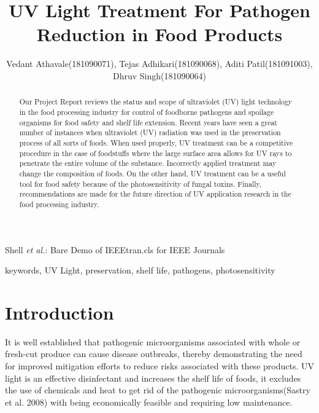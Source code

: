 \documentclass[journal]{IEEEtran}
\begin{document}
\title{\selectfont \centering UV Light Treatment For Pathogen Reduction in Food Products}

\author{\selectfont \centering 
		Vedant Athavale(181090071),
        Tejas Adhikari(181090068),
        Aditi Patil(181091003),
        Dhruv Singh(181090064)
        }
        
{Shell \MakeLowercase{\textit{et al.}}: Bare Demo of IEEEtran.cls for IEEE Journals}

\maketitle

\begin{abstract}
Our Project Report reviews the status and scope of ultraviolet (UV) light technology in the food processing industry for control of foodborne pathogens and spoilage organisms for food safety and shelf life extension. Recent years have seen a great number of instances when ultraviolet (UV) radiation was used in the preservation process of all sorts of foods. When used properly, UV treatment can be a competitive procedure in the case of foodstuffs where the large surface area allows for UV rays to penetrate the entire volume of the substance. Incorrectly applied treatment may change the composition of foods. On the other hand, UV treatment can be a useful tool for food safety because of the photosensitivity of fungal toxins. Finally, recommendations are made for the future direction of UV application research in the food processing industry. 
\end{abstract}

\begin{IEEEkeywords}
keywords, UV Light, preservation, shelf life, pathogens, photosensitivity
\end{IEEEkeywords}

\section{Introduction}
 It is well established that pathogenic microorganisms associated with whole or fresh-cut produce can cause disease outbreaks, thereby demonstrating the need for improved mitigation efforts to reduce risks associated with these products. UV light is an effective disinfectant and increases the shelf life of foods, it excludes the use of chemicals and heat to get rid of the pathogenic microorganisms(Sastry et al. 2008) with being economically feasible and requiring low maintenance.
\end{document}
